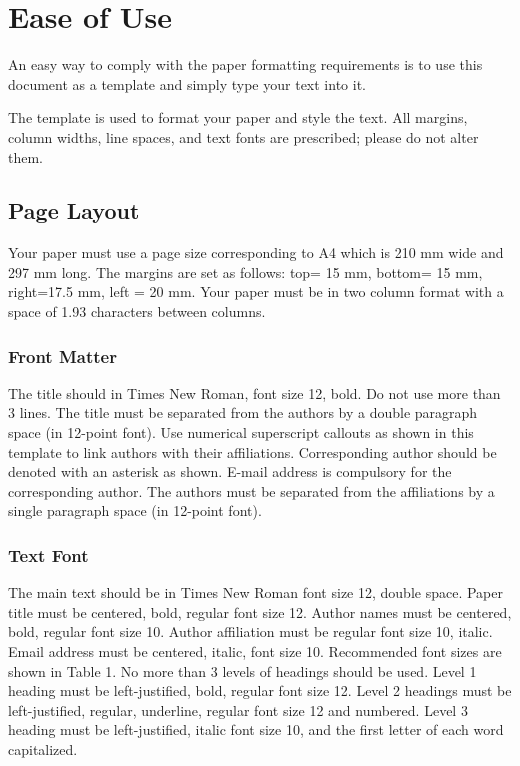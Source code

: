 \documentclass{siintec}
\begin{document}
\section{Ease of Use}
An easy way to comply with the paper formatting requirements is to use this document as a template and simply type your text into it.

The template is used to format your paper and style the text. All margins, column widths, line spaces, and text fonts are prescribed; please do not alter them.

\subsection{Page Layout}
Your paper must use a page size corresponding to A4 which is 210 mm wide and 297 mm long. The margins are set as follows: top= 15 mm, bottom= 15 mm, right=17.5 mm, left = 20 mm. Your paper must be in two column format with a space of 1.93 characters between columns.

\subsubsection{Front Matter}
The title should in Times New Roman, font size 12, bold. Do not use more than 3 lines. The title must be separated from the authors by a double paragraph space (in 12-point font). Use numerical superscript callouts as shown in this template to link authors with their affiliations.
Corresponding author should be denoted with an asterisk as shown. E-mail address is compulsory for the corresponding author.
The authors must be separated from the affiliations by a single paragraph space (in 12-point font).

\subsubsection{Text Font}
The main text should be in Times New Roman font size 12, double space. Paper title must be centered, bold, regular font size 12. Author names must be centered, bold, regular font size 10. Author affiliation must be regular font size 10, italic. Email address must be centered, italic, font size 10. Recommended font sizes are shown in Table 1. No more than 3 levels of headings should be used. Level 1 heading must be left-justified, bold, regular font size 12. Level 2 headings must be left-justified, regular, underline, regular font size 12 and numbered. Level 3 heading must be left-justified, italic font size 10, and the first letter of each word capitalized.
\end{document}
